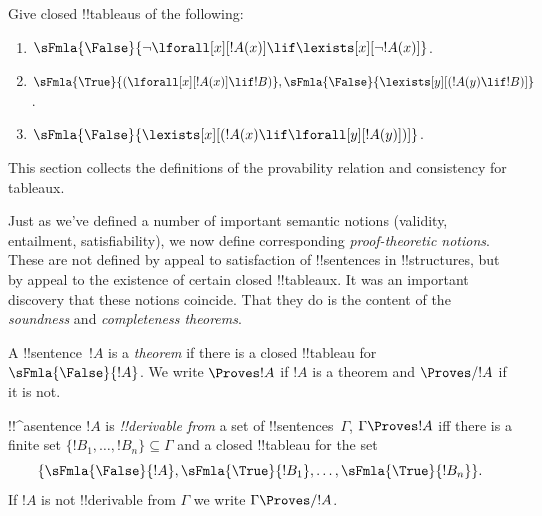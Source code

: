 \begin{prob}
Give closed !!{tableau}s of the following:
\begin{enumerate}
\item $\sFmla{\False}{\lnot\lforall[x][!A(x)] \lif \lexists[x][\lnot!A(x)]}$.
\item $\sFmla{\True}{(\lforall[x][!A(x)] \lif !B)}, \sFmla{\False}{\lexists[y][(!A(y) \lif !B)]}$.
\item $\sFmla{\False}{\lexists[x][(!A(x) \lif \lforall[y][!A(y)])]}$.
\end{enumerate}
\end{prob}






      

\begin{editorial}
This section collects the definitions of the provability relation
and consistency for tableaux.
\end{editorial}

\begin{explain}
Just as we've defined a number of important semantic notions
(validity, entailment, satisfiability), we now define corresponding
\emph{proof-theoretic notions}.  These are not defined by appeal to
satisfaction of !!{sentence}s in !!{structure}s, but by appeal to the
existence of certain closed !!{tableau}x.  It was an important
discovery that these notions coincide.  That they do is the content of
the \emph{soundness} and \emph{completeness theorems}.
\end{explain}


\begin{defn}[Theorems]
A !!{sentence}~$!A$ is a \emph{theorem} if there is a closed
!!{tableau} for~$\sFmla{\False}{!A}$.  We write $\Proves !A$ if $!A$
is a theorem and $\Proves/ !A$ if it is not.
\end{defn}

\begin{defn}[!!^{derivability}]
!!^a{sentence} $!A$ is \emph{!!{derivable} from} a set of
!!{sentence}s~$\Gamma$, $\Gamma \Proves !A$ iff there is a
finite set $\{!B_1, \dots, !B_n\} \subseteq \Gamma$
and a closed !!{tableau} for the set
\[
\{
  \sFmla{\False}{!A},
  \sFmla{\True}{!B_1}, \dots,
  \sFmla{\True}{!B_n}
  \}.
\]
If $!A$ is not !!{derivable} from $\Gamma$ we write $\Gamma \Proves/
!A$.
\end{defn}

